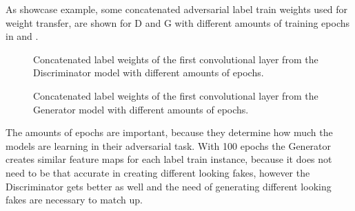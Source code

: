 As showcase example, some concatenated adversarial label train weights used for weight transfer, are shown for D and G with different amounts of training epochs in  and .
\begin{figure}[!ht]
  \centering
  \caption{Concatenated label weights of the first convolutional layer from the Discriminator model with different amounts of epochs.}
  \label{fig:nn_adv_label_weights_d}
\end{figure}
\FloatBarrier
\noindent
\begin{figure}[!ht]
  \centering
  \caption{Concatenated label weights of the first convolutional layer from the Generator model with different amounts of epochs.}
  \label{fig:nn_adv_label_weights_g}
\end{figure}
\FloatBarrier
\noindent
The amounts of epochs are important, because they determine how much the models are learning in their adversarial task.
With 100 epochs the Generator creates similar feature maps for each label train instance, because it does not need to be that accurate in creating different looking fakes, however the Discriminator gets better as well and the need of generating different looking fakes are necessary to match up.
